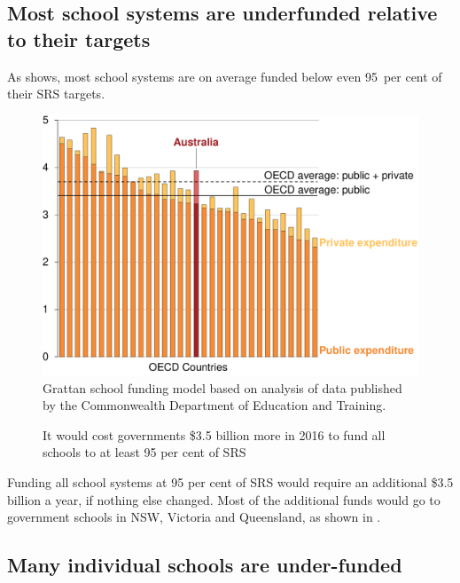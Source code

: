 \documentclass{grattan}
\begin{document}
\subsection{Most school systems are underfunded relative to their targets}\label{subsec:most-school-systems-are-under-funded}

As  shows, most school systems are on average funded below even 95~per cent of their SRS targets.

\begin{figure}
\caption{It would cost governments \$3.5 billion more in 2016 to fund all schools to at least 95 per cent of SRS}\label{fig:cost-of-funding-all-schools-to-95-per-cent}

\includegraphics[page=4]{atlas/Charts.pdf}
%
{Grattan school funding model based on analysis of data published by the Commonwealth Department of Education and Training.}
\end{figure}


Funding all school systems at 95 per cent of SRS would require an additional \$3.5 billion a year, if nothing else changed.
Most of the additional funds would go to government schools in NSW, Victoria and Queensland, as shown in .
\cleardoublepage


\subsection{Many individual schools are under-funded }\label{subsec:most-schools-are-under-funded}
\end{document}
